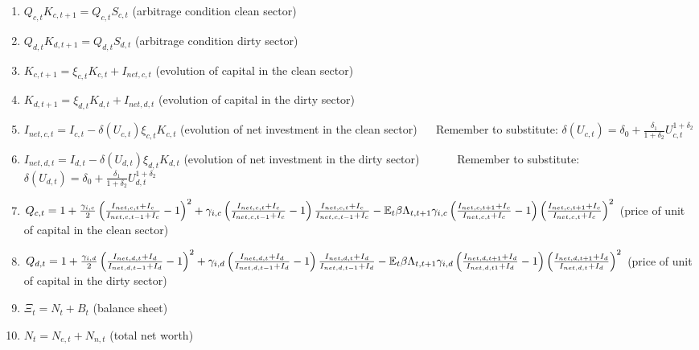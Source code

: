 \documentclass{article}
\begin{document}
\begin{enumerate}
\item $Q_{c,t}K_{c,t+1}=Q_{c,t}S_{c,t}$ (arbitrage condition clean sector)

\item $Q_{d,t}K_{d,t+1}=Q_{d,t}S_{d,t}$ (arbitrage condition dirty sector)

\item $K_{c,t+1}=\xi _{c,t}K_{c,t}+I_{net,c,t}$ (evolution of capital in the
clean sector)

\item $K_{d,t+1}=\xi _{d,t}K_{d,t}+I_{net,d,t}$ (evolution of capital in the
dirty sector)

\item $I_{net,c,t}=I_{c,t}-\delta (U_{c,t})\xi _{c,t}K_{c,t}$ (evolution of
net investment in the clean sector) $\ \ \ \ \ \ $Remember to substitute: $%
\delta (U_{c,t})=\delta _{0}+\frac{\delta _{1}}{1+\delta _{2}}%
U_{c,t}^{1+\delta _{2}}$

\item $I_{net,d,t}=I_{d,t}-\delta (U_{d,t})\xi _{d,t}K_{d,t}$ (evolution of
net investment in the dirty sector) \ \ \ \ \ \ Remember to substitute: $%
\delta (U_{d,t})=\delta _{0}+\frac{\delta _{1}}{1+\delta _{2}}%
U_{d,t}^{1+\delta _{2}}$

\item $Q_{c,t}=1+\frac{\gamma _{i,c}}{2}\left( \frac{I_{net,c,t}+I_{c}}{%
I_{net,c,t-1}+I_{c}}-1\right) ^{2}+\gamma _{i,c}\left( \frac{%
I_{net,c,t}+I_{c}}{I_{net,c,t-1}+I_{c}}-1\right) \frac{I_{net,c,t}+I_{c}}{%
I_{net,c,t-1}+I_{c}}-\mathbb{E}_{t}\beta \Lambda _{t,t+1}\gamma _{i,c}\left( 
\frac{I_{net,c,t+1}+I_{c}}{I_{net,c,t}+I_{c}}-1\right) \left( \frac{%
I_{net,c,t+1}+I_{c}}{I_{net,c,t}+I_{c}}\right) ^{2}$ (price of unit of
capital in the clean sector)

\item $Q_{d,t}=1+\frac{\gamma _{i,d}}{2}\left( \frac{I_{net,d,t}+I_{d}}{%
I_{net,d,t-1}+I_{d}}-1\right) ^{2}+\gamma _{i,d}\left( \frac{%
I_{net,d,t}+I_{d}}{I_{net,d,t-1}+I_{d}}-1\right) \frac{I_{net,d,t}+I_{d}}{%
I_{net,d,t-1}+I_{d}}-\mathbb{E}_{t}\beta \Lambda _{t,t+1}\gamma _{i,d}\left( 
\frac{I_{net,d,t+1}+I_{d}}{I_{net,d,t1}+I_{d}}-1\right) \left( \frac{%
I_{net,d,t+1}+I_{d}}{I_{net,d,t}+I_{d}}\right) ^{2}$ (price of unit of
capital in the dirty sector)

\item $\Xi _{t}=N_{t}+B_{t}$ (balance sheet)

\item $N_{t}=N_{e,t}+N_{n,t}$ (total net worth)


\end{enumerate}
\end{document}
